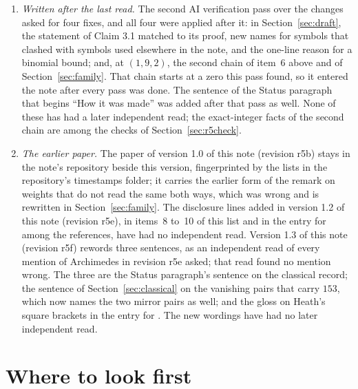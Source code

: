 \documentclass[11pt]{article}
\begin{document}
\begin{enumerate}
\item \emph{Written after the last read.} The second AI verification pass over the changes asked for four fixes, and all four were applied after it: in Section~\ref{sec:draft}, the statement of Claim 3.1 matched to its proof, new names for symbols that clashed with symbols used elsewhere in the note, and the one-line reason for a binomial bound; and, at $(1,9,2)$, the second chain of item~6 above and of Section~\ref{sec:family}. That chain starts at a zero this pass found, so it entered the note after every pass was done. The sentence of the Status paragraph that begins ``How it was made'' was added after that pass as well. None of these has had a later independent read; the exact-integer facts of the second chain are among the checks of Section~\ref{sec:r5check}.
\item \emph{The earlier paper.} The paper of version 1.0 of this note (revision r5b) stays in the note's repository beside this version, fingerprinted by the lists in the repository's timestamps folder; it carries the earlier form of the remark on weights that do not read the same both ways, which was wrong and is rewritten in Section~\ref{sec:family}. The disclosure lines added in version 1.2 of this note (revision r5e), in items~8 to~10 of this list and in the entry for \cite{UN} among the references, have had no independent read. Version 1.3 of this note (revision r5f) rewords three sentences, as an independent read of every mention of Archimedes in revision r5e asked; that read found no mention wrong. The three are the Status paragraph's sentence on the classical record; the sentence of Section~\ref{sec:classical} on the vanishing pairs that carry $153$, which now names the two mirror pairs as well; and the gloss on Heath's square brackets in the entry for \cite{Ar}. The new wordings have had no later independent read.
\end{enumerate}

\section{Where to look first}\label{sec:look}
\end{document}

